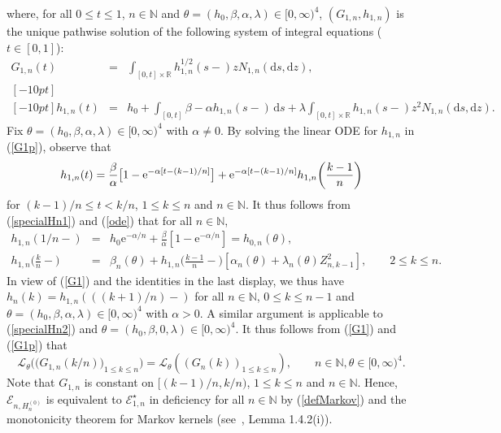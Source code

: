 \documentclass[number,citesort,seceqn,dvips]{arxbj}
\newcommand{\eqref}[1]{(\ref{#1})}
\newcommand{\RR}{\mathbb{R}}
\newcommand{\NN}{\mathbb{N}}
\newcommand{\EEE}{{\mathcal E}}
\newcommand{\LLL}{{\mathcal L}}
\begin{document}
%
where, for all $0\le t\le1$, $n\in\NN$ and
$\theta=(h_0,\beta,\alpha,\lambda)\in[0,\infty)^4$,
$(G_{1,n},h_{1,n})$ is the unique pathwise solution of
the following system of integral equations ($t\in[0,1]$):
%
\begin{eqnarray}\label{G1p}
  G_{1,n}(t) & = & \int_{[0,t]\times\RR} h^{1/2}_{1,n}(s-) z
N_{1,n}(\mathrm{d}s,\mathrm{d}z) ,\nonumber\\ [-10pt]\\ [-10pt]
 h_{1,n}(t) & = & h_0 + \int_{[0,t]} \beta- \alpha
h_{1,n}(s-)\,\mathrm{d}s
+ \lambda\int_{[0,t]\times\RR} h_{1,n}(s-)z^2 N_{1,n}(\mathrm{d}s,\mathrm{d}z).\nonumber
\end{eqnarray}
%
Fix $\theta=(h_0,\beta,\alpha,\lambda)\in[0,\infty)^4$ with
$\alpha\neq
0$. By solving the linear ODE for $h_{1,n}$ in \eqref{G1p}, observe
that
%
\begin{equation}\label{ode}
h_{1,n}(t) = \frac\beta{\alpha}
 \bigl[1 - \mathrm{e}^{-\alpha[t-(k - 1)/n]} \bigr]+
\mathrm{e}^{-\alpha[t-(k - 1)/n]} h_{1,n} \biggl(\frac{k-1} n
\biggr)\vadjust{\goodbreak}
\end{equation}
%
for $(k - 1)/n\le t<k/n$, $1\le k\le n$ and $n\in\NN$. It thus
follows from \eqref{specialHn1} and \eqref{ode} that for all $n\in
\NN$,
%
\begin{eqnarray*}\label{inth2h2n}
h_{1,n}(1/n-)&=&h_0\mathrm{e}^{-\alpha/n}+\frac{\beta}{\alpha}[1 -
\mathrm{e}^{-\alpha/n}] = h_{0,n}(\theta),\\
h_{1,n} \biggl(\frac k n- \biggr)&=&\beta_n(\theta)+
h_{1,n} \biggl(\frac{k - 1}
n- \biggr)  [\alpha_n(\theta)+\lambda_n(\theta)
Z_{n,k-1}^2 ],\qquad 2\le
k\le n.
\end{eqnarray*}
%
In view of \eqref{G1} and the identities in the last display, we
thus have
$h_{n}(k)=h_{1,n} (((k + 1)/n)- )$ for all $n\in\NN$,
$0 \le  k\le n - 1$ and
$\theta=(h_0,\beta,\alpha,\lambda)\in[0,\infty)^4$ with $\alpha
>0$. A
similar argument is applicable to \eqref{specialHn2} and
$\theta=(h_0,\beta,0,\lambda)\in[0,\infty)^4$. It thus follows from
\eqref{G1} and \eqref{G1p} that
%
\[
\LLL_\theta \bigl(\bigl(G_{1,n}(k/n)\bigr)_{1\le k\le n} \bigr) =
\LLL_\theta ((G_{n}(k))_{1\le k\le n} ),\qquad
n\in\NN , \theta\in[0,\infty)^4 .
\]
%
Note that $G_{1,n}$ is constant
on $[(k  -  1)/n,k/n)$, $1 \le  k \le  n$ and $n\in\NN$. Hence,
$\EEE_{n,H_n^{(0)}}$ is equivalent to $\EEE^{\star}_{1,n}$ in
deficiency for all $n\in\NN$ by \eqref{defMarkov} and the monotonicity
theorem for\vspace*{1pt} Markov kernels (see~\cite{Re93}, Lemma 1.4.2(i)).
\end{document}
